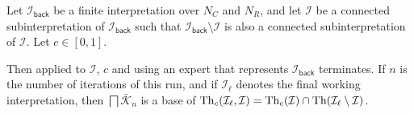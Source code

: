 \begin{Theorem}
  \label{thm:model-exploration-by-confidence}
  Let $\mathcal{I}_{\mathsf{back}}$ be a finite interpretation over $N_{C}$ and $N_{R}$,
  and let $\mathcal{I}$ be a connected subinterpretation of $\mathcal{I}_{\mathsf{back}}$
  such that $\mathcal{I}_{\mathsf{back}} \setminus \mathcal{I}$ is also a connected
  subinterpretation of $\mathcal{I}$.  Let $c \in [0,1]$.

  Then  applied to $\mathcal{I}$, $c$ and using
  an expert that represents $\mathcal{I}_{\mathsf{back}}$ terminates.  If $n$ is the
  number of iterations of this run, and if $\mathcal{I}_{\ell}$ denotes the final working
  interpretation, then $\bigsqcap \bar{\mathcal{K}}_{n}$ is a base of
  $\operatorname{Th}_{c}(\mathcal{I}_{\ell}, \mathcal{I}) = \operatorname{Th}_{c}(\mathcal{I}) \cap
  \operatorname{Th}(\mathcal{I}_{\ell} \setminus \mathcal{I})$.
\end{Theorem}
